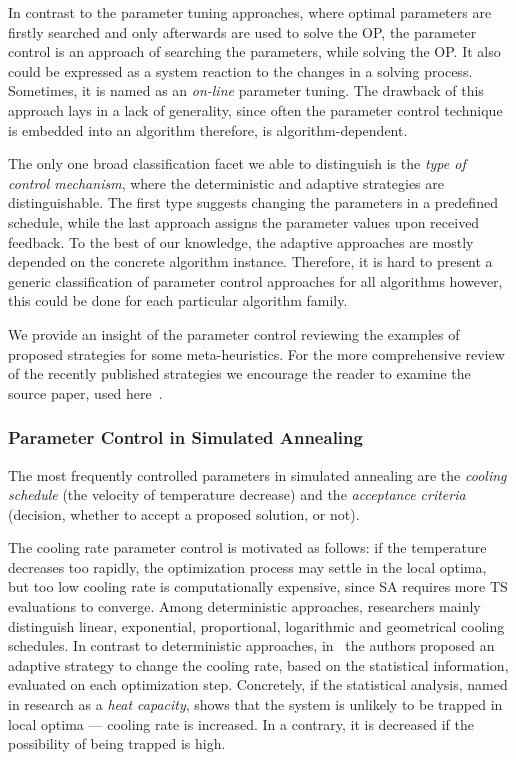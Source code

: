 In contrast to the parameter tuning approaches, where optimal parameters are firstly searched and only afterwards are used to solve the OP, the parameter control is an approach of searching the parameters, while solving the OP. It also could be expressed as a system reaction to the changes in a solving process. Sometimes, it is named as an \emph{on-line} parameter tuning. The drawback of this approach lays in a lack of generality, since often the parameter control technique is embedded into an algorithm therefore, is algorithm-dependent.

The only one broad classification facet we able to distinguish is the \emph{type of control mechanism}, where the deterministic and adaptive strategies are distinguishable. The first type suggests changing the parameters in a predefined schedule, while the last approach assigns the parameter values upon received feedback. To the best of our knowledge, the adaptive approaches are mostly depended on the concrete algorithm instance. Therefore, it is hard to present a generic classification of parameter control approaches for all algorithms however, this could be done for each particular algorithm family.

We provide an insight of the parameter control reviewing the examples of proposed strategies for some meta-heuristics. For the more comprehensive review of the recently published strategies we encourage the reader to examine the source paper, used here~\cite{huang2019survey}.


\subsubsection{Parameter Control in Simulated Annealing}\label{bg: parameter control: SA}
The most frequently controlled parameters in simulated annealing are the \emph{cooling schedule} (the velocity of temperature decrease) and the \emph{acceptance criteria} (decision, whether to accept a proposed solution, or not).

The cooling rate parameter control is motivated as follows: if the temperature decreases too rapidly, the optimization process may settle in the local optima, but too low cooling rate is computationally expensive, since SA requires more TS evaluations to converge. Among deterministic approaches, researchers mainly distinguish linear, exponential, proportional, logarithmic and geometrical cooling schedules. In contrast to deterministic approaches, in~\cite{karabin2020simulated} the authors proposed an adaptive strategy to change the cooling rate, based on the statistical information, evaluated on each optimization step. Concretely, if the statistical analysis, named in research as a \emph{heat capacity}, shows that the system is unlikely to be trapped in local optima — cooling rate is increased. In a contrary, it is decreased if the possibility of being trapped is high.

